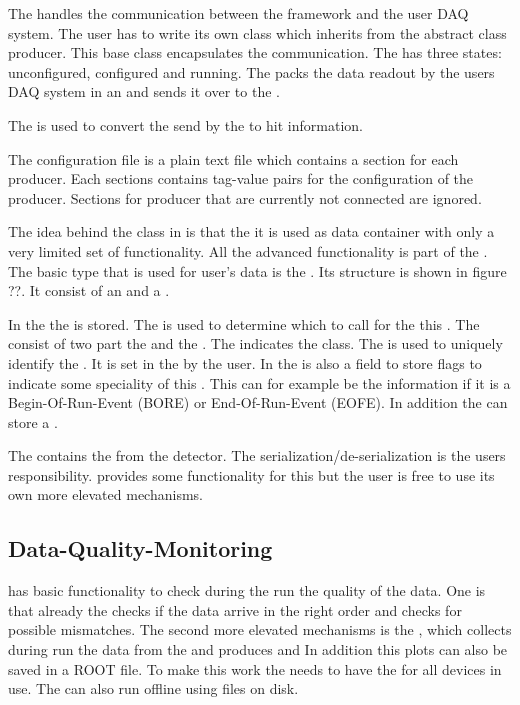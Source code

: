 The \producer handles the communication between the \eudaq framework and the user DAQ system. 
The user has to write its own \producer class which inherits from the abstract class producer. 
This base class encapsulates the \tcp communication. The \producer has three states: unconfigured, configured and running. 
The \producer packs the data readout by the users DAQ system in an \eudaq \event and sends it over \tcp to the \dc. 

The \dataconverterplugin is used to convert the \rawdata send by the \producer to hit information. 


The configuration file is a plain text file which contains a section for each producer. 
Each sections contains tag-value pairs for the configuration of the producer. 
Sections for producer that are currently not connected are ignored. 

The idea behind the \event class in \eudaq is that the it is used as data container with only a very limited set of functionality. 
All the advanced functionality is part of the \dataconverterplugin. 
The basic \event type that is used for user's data is the \rawdataevent. 
Its structure is shown in figure ??. It consist of an \eventheader and a \datablock. 

In the \eventheader the \eventtype is stored. 
The \eventtype is used to determine which \dataconverterplugin to call for the this \event. 
The \eventtype consist of two part the \eventid and the \subeventtype. 
The \eventid indicates the \cpp class. 
The \subeventtype is used to uniquely identify the \event. 
It is set in the \producer by the user. 
In the \eventheader is also a field to store flags to indicate some speciality of this \event. 
This can for example be the information if it is a Begin-Of-Run-Event (BORE) or End-Of-Run-Event (EOFE). 
In addition the \eventheader can store a \timestamp. 
 
The \datablock contains the \rawdata from the detector. The serialization/de-serialization is the users responsibility. 
\eudaq provides some functionality for this but the user is free to use its own more elevated mechanisms. 
 

\subsection{Data-Quality-Monitoring}

\eudaq has basic functionality to check during the run the quality of the data. 
One is that already the \dc checks if the data arrive in the right order and checks for possible mismatches. 
The second more elevated mechanisms is the \onlinemon, which collects during run the data from the \dc and produces \hitmaps and \corplots
In addition this  plots can also be saved in a ROOT file. 
To make this work the \onlinemon needs to have the \dataconverterplugin for all devices in use. 
The \onlinemon can also run offline using files on disk.


